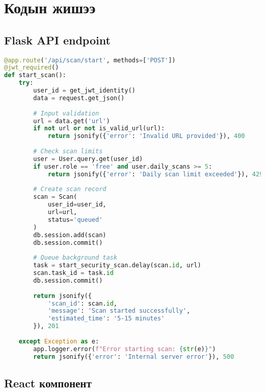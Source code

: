 \documentclass[main.tex]{subfiles}
\begin{document}
\chapter{Кодын жишээ}

\section{Flask API endpoint}

\begin{lstlisting}[language=Python, caption=Scan эхлүүлэх API endpoint]
@app.route('/api/scan/start', methods=['POST'])
@jwt_required()
def start_scan():
    try:
        user_id = get_jwt_identity()
        data = request.get_json()
        
        # Input validation
        url = data.get('url')
        if not url or not is_valid_url(url):
            return jsonify({'error': 'Invalid URL provided'}), 400
        
        # Check scan limits
        user = User.query.get(user_id)
        if user.role == 'free' and user.daily_scans >= 5:
            return jsonify({'error': 'Daily scan limit exceeded'}), 429
        
        # Create scan record
        scan = Scan(
            user_id=user_id,
            url=url,
            status='queued'
        )
        db.session.add(scan)
        db.session.commit()
        
        # Queue background task
        task = start_security_scan.delay(scan.id, url)
        scan.task_id = task.id
        db.session.commit()
        
        return jsonify({
            'scan_id': scan.id,
            'message': 'Scan started successfully',
            'estimated_time': '5-15 minutes'
        }), 201
        
    except Exception as e:
        app.logger.error(f"Error starting scan: {str(e)}")
        return jsonify({'error': 'Internal server error'}), 500
\end{lstlisting}

\section{React компонент}
\end{document}
